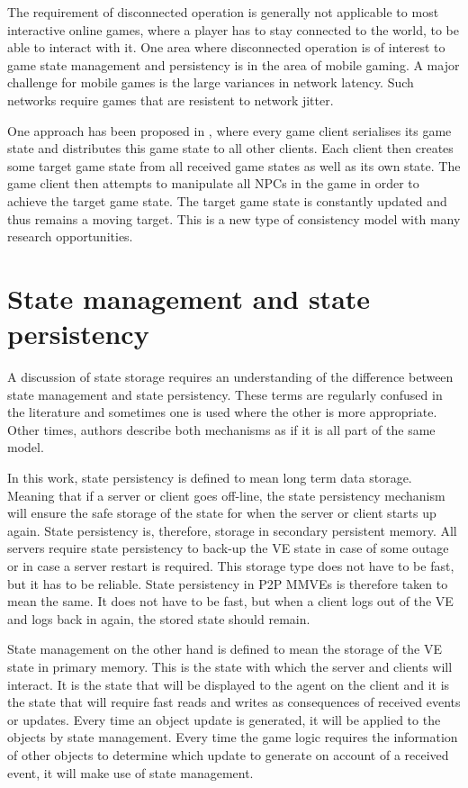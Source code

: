 The requirement of disconnected operation is generally not applicable to most interactive online games, where a player has to stay connected to the world, to be able to interact with it. One area where disconnected operation is of interest to game state management and persistency is in the area of mobile gaming. A major challenge for mobile games is the large variances in network latency. Such networks require games that are resistent to network jitter.

One approach has been proposed in \cite{Chandler_disconnected_games}, where every game client serialises its game state and distributes this game state to all other clients. Each client then creates some target game state from all received game states as well as its own state. The game client then attempts to manipulate all NPCs in the game in order to achieve the target game state. The target game state is constantly updated and thus remains a moving target. This is a new type of consistency model with many research opportunities.

\section{State management and state persistency}
A discussion of state storage requires an understanding of the difference between state management and state persistency. These terms are regularly confused in the literature and sometimes one is used where the other is more appropriate. Other times, authors describe both mechanisms as if it is all part of the same model.

In this work, state persistency is defined to mean long term data storage. Meaning that if a server or client goes off-line, the state persistency mechanism will ensure the safe storage of the state for when the server or client starts up again. State persistency is, therefore, storage in secondary persistent memory. All servers require state persistency to back-up the VE state in case of some outage or in case a server restart is required. This storage type does not have to be fast, but it has to be reliable. State persistency in P2P MMVEs is therefore taken to mean the same. It does not have to be fast, but when a client logs out of the VE and logs back in again, the stored state should remain.

State management on the other hand is defined to mean the storage of the VE state in primary memory. This is the state with which the server and clients will interact. It is the state that will be displayed to the agent on the client and it is the state that will require fast reads and writes as consequences of received events or updates. Every time an object update is generated, it will be applied to the objects by state management. Every time the game logic requires the information of other objects to determine which update to generate on account of a received event, it will make use of state management.

